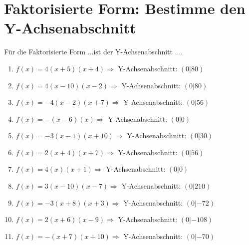 \documentclass{article}%
\begin{document}
\section{Faktorisierte Form: Bestimme den Y{-}Achsenabschnitt}%
\label{sec:FaktorisierteFormBestimmedenY{-}Achsenabschnitt}%
Für die Faktorisierte Form ...ist der Y{-}Achsenabschnitt ....%
\begin{enumerate}[label=\alph*)]%
\item%
\newline\vspace{0.5cm}$f(x)=4(x+5)(x+4) \Rightarrow $ Y-Achsenabschnitt: $ (0|80) $%
\item%
\newline\vspace{0.5cm}$f(x)=4(x-10)(x-2) \Rightarrow $ Y-Achsenabschnitt: $ (0|80) $%
\item%
\newline\vspace{0.5cm}$f(x)=-4(x-2)(x+7) \Rightarrow $ Y-Achsenabschnitt: $ (0|56) $%
\item%
\newline\vspace{0.5cm}$f(x)=-(x-6)(x) \Rightarrow $ Y-Achsenabschnitt: $ (0|0) $%
\item%
\newline\vspace{0.5cm}$f(x)=-3(x-1)(x+10) \Rightarrow $ Y-Achsenabschnitt: $ (0|30) $%
\item%
\newline\vspace{0.5cm}$f(x)=2(x+4)(x+7) \Rightarrow $ Y-Achsenabschnitt: $ (0|56) $%
\item%
\newline\vspace{0.5cm}$f(x)=4(x)(x+1) \Rightarrow $ Y-Achsenabschnitt: $ (0|0) $%
\item%
\newline\vspace{0.5cm}$f(x)=3(x-10)(x-7) \Rightarrow $ Y-Achsenabschnitt: $ (0|210) $%
\item%
\newline\vspace{0.5cm}$f(x)=-3(x+8)(x+3) \Rightarrow $ Y-Achsenabschnitt: $ (0|-72) $%
\item%
\newline\vspace{0.5cm}$f(x)=2(x+6)(x-9) \Rightarrow $ Y-Achsenabschnitt: $ (0|-108) $%
\item%
\newline\vspace{0.5cm}$f(x)=-(x+7)(x+10) \Rightarrow $ Y-Achsenabschnitt: $ (0|-70) $%

\end{enumerate}
\end{document}
